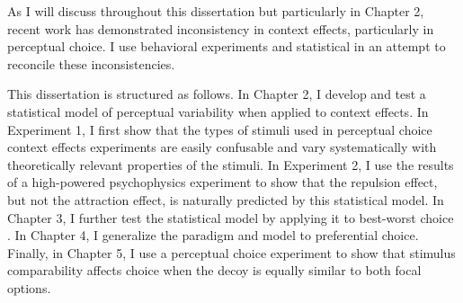 As I will discuss throughout this dissertation but particularly in Chapter 2, recent work has demonstrated inconsistency in context effects, particularly in perceptual choice. I use behavioral experiments and statistical in an attempt to reconcile these inconsistencies.

This dissertation is structured as follows. In Chapter 2, I develop and test a statistical model of perceptual variability when applied to context effects. In Experiment 1, I first show that the types of stimuli used in perceptual choice context effects experiments are easily confusable and vary systematically with theoretically relevant properties of the stimuli. In Experiment 2, I use the results of a high-powered psychophysics experiment to show that the repulsion effect, but not the attraction effect, is naturally predicted by this statistical model. In Chapter 3, I further test the statistical model by applying it to best-worst choice \parencite{flynnBestWorstScaling2007}. In Chapter 4, I generalize the paradigm and model to preferential choice. Finally, in Chapter 5, I use a perceptual choice experiment to show that stimulus comparability affects choice when the decoy is equally similar to both focal options. 
